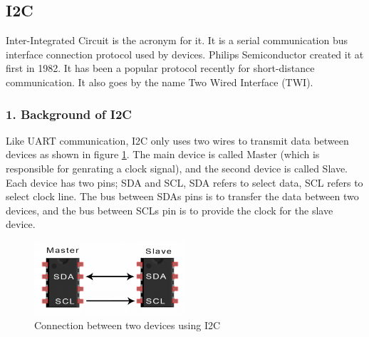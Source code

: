 \subsection{I2C}
Inter-Integrated Circuit is the acronym for it. It is a serial communication bus interface connection protocol used by devices. Philips Semiconductor created it at first in 1982. It has been a popular protocol recently for short-distance communication. It also goes by the name Two Wired Interface (TWI).

\subsubsection{1. Background of I2C}
Like UART communication, I2C only uses two wires to transmit data between devices as shown in figure \ref{fig:connectiong-i2c}. The main device is called Master (which is responsible for genrating a clock signal), and the second device is called Slave. Each device has two pins; SDA and SCL, SDA refers to select data, SCL refers to select clock line. The bus between SDAs pins is to transfer the data between two devices, and the bus between SCLs pin is to provide the clock for the slave device. 

\begin{figure}[h]
   \centering
    \includegraphics[width=0.5\textwidth]{figure/3_4.png}
    \caption{Connection between two devices using I2C}
    \label{fig:connectiong-i2c}
\end{figure}

